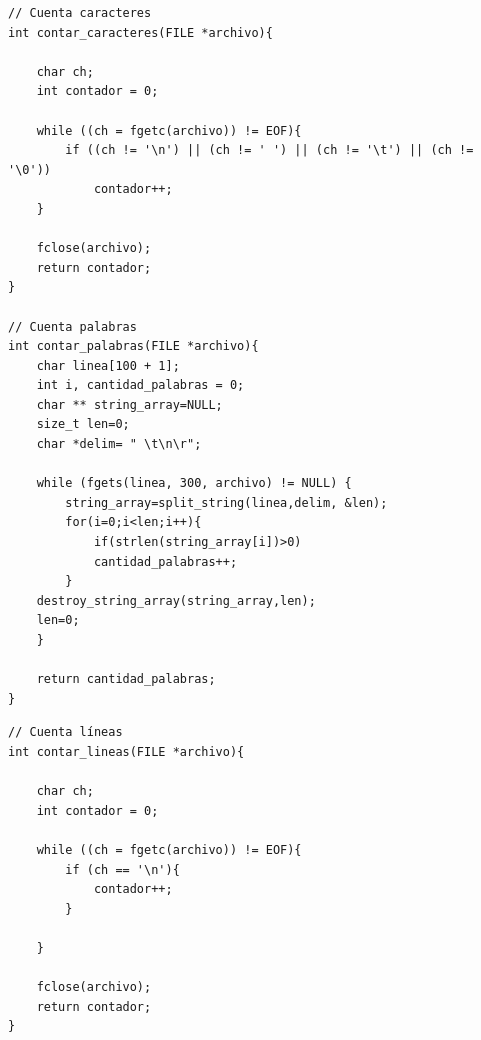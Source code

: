 \documentclass[a4paper, 10pt, twoside, notitlepage]{article}
\begin{document}
\begin{verbatim}
// Cuenta caracteres
int contar_caracteres(FILE *archivo){

    char ch;
    int contador = 0;

    while ((ch = fgetc(archivo)) != EOF){
        if ((ch != '\n') || (ch != ' ') || (ch != '\t') || (ch != '\0'))
            contador++;
    }

    fclose(archivo);
    return contador;
}

// Cuenta palabras
int contar_palabras(FILE *archivo){
    char linea[100 + 1];
    int i, cantidad_palabras = 0;
    char ** string_array=NULL;
    size_t len=0;
    char *delim= " \t\n\r";

    while (fgets(linea, 300, archivo) != NULL) {
        string_array=split_string(linea,delim, &len);
        for(i=0;i<len;i++){
            if(strlen(string_array[i])>0)
            cantidad_palabras++;
        }
    destroy_string_array(string_array,len);
    len=0;           
    }    

    return cantidad_palabras;
}
\end{verbatim}
\newpage

\begin{verbatim}
// Cuenta líneas
int contar_lineas(FILE *archivo){
    
    char ch;
    int contador = 0;

    while ((ch = fgetc(archivo)) != EOF){
        if (ch == '\n'){
            contador++;
        }

    }

    fclose(archivo);
    return contador;
}
\end{verbatim}
\newpage
\end{document}

